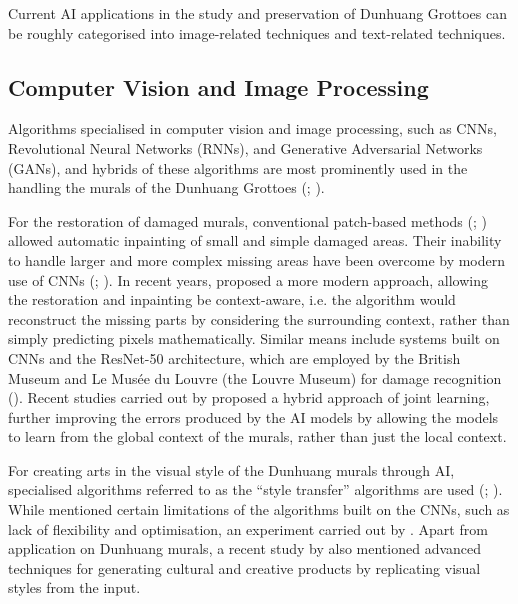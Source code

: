 Current AI applications in the study and preservation of Dunhuang Grottoes can be roughly categorised into
image-related techniques and text-related techniques.

\subsection{Computer Vision and Image Processing}
\label{sec:computer-vision-image-processing}

Algorithms specialised in computer vision and image processing, such as CNNs, Revolutional Neural Networks
(RNNs), and Generative Adversarial Networks (GANs), and hybrids of these algorithms are most prominently
used in the handling the murals of the Dunhuang Grottoes (;
).

For the restoration of damaged murals, conventional patch-based methods
(; )
allowed automatic inpainting of small and simple damaged areas. Their inability to handle larger and more complex
missing areas have been overcome by modern use of CNNs (;
).
In recent years,  proposed a more modern approach,
allowing the restoration and inpainting be context-aware, i.e. the algorithm would reconstruct the missing parts
by considering the surrounding context, rather than simply predicting pixels mathematically.
Similar means include systems built on CNNs and the ResNet-50 architecture, which are employed by the British
Museum and Le Musée du Louvre (the Louvre Museum) for damage recognition
().
Recent studies carried out by  proposed a hybrid approach of joint
learning, further improving the errors produced by the AI models by allowing the models to learn from the global
context of the murals, rather than just the local context.

For creating arts in the visual style of the Dunhuang murals through AI, specialised algorithms referred to as
the ``style transfer'' algorithms are used (;
). While  mentioned certain limitations of the
algorithms built on the CNNs, such as lack of flexibility and optimisation, an experiment carried out by 
.
Apart from application on Dunhuang murals,
a recent study by  also mentioned advanced techniques for generating
cultural and creative products by replicating visual styles from the input.

